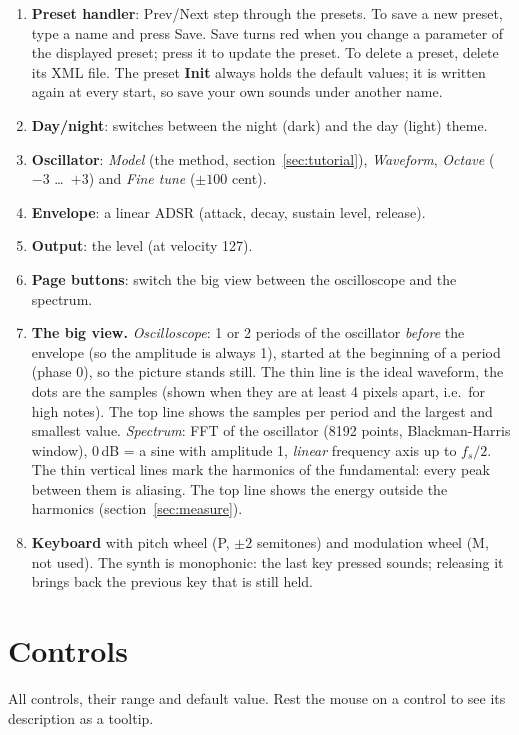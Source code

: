 \documentclass[11pt]{article}
\begin{document}
\begin{enumerate}
    \item \textbf{Preset handler}: Prev/Next step through the presets. To save a new preset,
    type a name and press Save. Save turns red when you change a parameter of the displayed
    preset; press it to update the preset. To delete a preset, delete its XML file.
    The preset \textbf{Init} always holds the default values; it is written again at every start,
    so save your own sounds under another name.
    \item \textbf{Day/night}: switches between the night (dark) and the day (light) theme.
    \item \textbf{Oscillator}: \emph{Model} (the method, section~\ref{sec:tutorial}), \emph{Waveform},
    \emph{Octave} ($-3$ \dots\ $+3$) and \emph{Fine tune} ($\pm 100$ cent).
    \item \textbf{Envelope}: a linear ADSR (attack, decay, sustain level, release).
    \item \textbf{Output}: the level (at velocity 127).
    \item \textbf{Page buttons}: switch the big view between the oscilloscope and the spectrum.
    \item \textbf{The big view.} \emph{Oscilloscope}: 1 or 2 periods of the oscillator \emph{before} the
    envelope (so the amplitude is always 1), started at the beginning of a period (phase 0), so the
    picture stands still. The thin line is the ideal waveform, the dots are the samples (shown when
    they are at least 4 pixels apart, i.e.\ for high notes). The top line shows the samples per
    period and the largest and smallest value. \emph{Spectrum}: FFT of the oscillator (8192 points,
    Blackman-Harris window), 0\,dB = a sine with amplitude 1, \emph{linear} frequency axis up to
    $f_s/2$. The thin vertical lines mark the harmonics of the fundamental: every peak between
    them is aliasing. The top line shows the energy outside the harmonics (section~\ref{sec:measure}).
    \item \textbf{Keyboard} with pitch wheel (P, $\pm 2$ semitones) and modulation wheel (M, not used).
    The synth is monophonic: the last key pressed sounds; releasing it brings back the previous key
    that is still held.
\end{enumerate}

\section{Controls}\label{sec:controls}
All controls, their range and default value. Rest the mouse on a control to see its
description as a tooltip.
\end{document}
